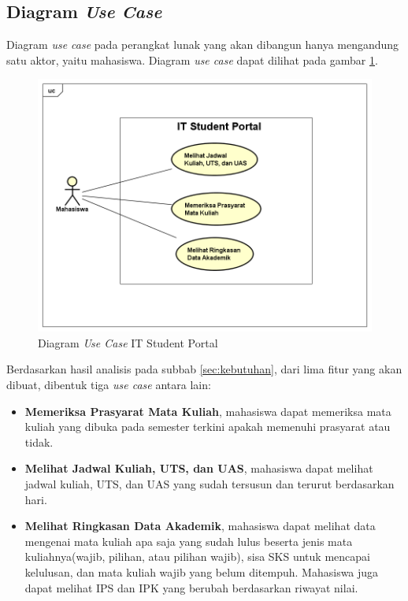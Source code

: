 \subsection{Diagram \textit{Use Case}}
Diagram \textit{use case} pada perangkat lunak yang akan dibangun hanya mengandung satu aktor, yaitu mahasiswa. Diagram \textit{use case} dapat dilihat pada gambar \ref{fig:3_usecase_diagram}. 
		\begin{figure}[H]
			\centering
			\includegraphics[scale=0.5]{Gambar/usecase-diagram}
			\caption{Diagram \textit{Use Case} IT Student Portal} 
			\label{fig:3_usecase_diagram}
		\end{figure}
Berdasarkan hasil analisis pada subbab \ref{sec:kebutuhan}, dari lima fitur yang akan dibuat, dibentuk tiga \textit{use case} antara lain:
\begin{itemize}
	\item \textbf{Memeriksa Prasyarat Mata Kuliah}, mahasiswa dapat memeriksa mata kuliah yang dibuka pada semester terkini apakah memenuhi prasyarat atau tidak. 
	\item \textbf{Melihat Jadwal Kuliah, UTS, dan UAS}, mahasiswa dapat melihat jadwal kuliah, UTS, dan UAS yang sudah tersusun dan terurut berdasarkan hari.
	\item \textbf{Melihat Ringkasan Data Akademik}, mahasiswa dapat melihat data mengenai mata kuliah apa saja yang sudah lulus beserta jenis mata kuliahnya(wajib, pilihan, atau pilihan wajib), sisa SKS untuk mencapai kelulusan, dan mata kuliah wajib yang belum ditempuh. Mahasiswa juga dapat melihat IPS dan IPK yang berubah berdasarkan riwayat nilai.
\end{itemize}

